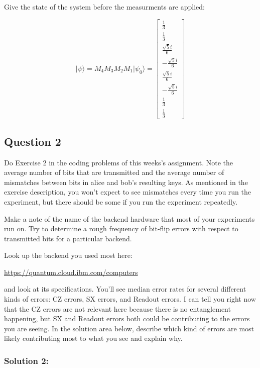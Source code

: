 \documentclass{article}
\begin{document}
\vspace{5mm}

\noindent Give the state of the system before the measurments are applied:

\vspace{5mm}

\[|\psi\rangle = M_4M_3M_2M_1|\psi_0\rangle = \begin{bmatrix}\frac{1}{3}\\\frac{1}{3}\\\frac{\sqrt{5} i}{6}\\- \frac{\sqrt{5} i}{6}\\\frac{\sqrt{5} i}{6}\\- \frac{\sqrt{5} i}{6}\\\frac{1}{3}\\\frac{1}{3}\end{bmatrix}\]


\subsection*{Question 2}

Do Exercise 2 in the coding problems of this weeks's assignment. Note the average number of bits that are transmitted 
and the average number of mismatches between bits in alice and bob's resulting keys. As mentioned in the exercise 
description, you won't expect to see mismatches every time you run the experiment, but there should be some if you
run the experiment repeatedly. 

Make a note of the name of the backend hardware that most of your experiments run on. Try to determine a 
rough frequency of bit-flip errors with respect to transmitted bits for a particular backend. 

Look up the backend you used most here:

\url{https://quantum.cloud.ibm.com/computers}

and look at its specifications. You'll see median error rates for several different kinds of errors: CZ errors, 
SX errors, and Readout errors. I can tell you right now that the CZ errors are not relevant here because there is no 
entanglement happening, but SX and Readout errors both could be contributing to the errors you are seeing. In the 
solution area below, describe which kind of errors are most likely contributing most to what you see and explain why.

\subsubsection*{Solution 2:}
\end{document}
